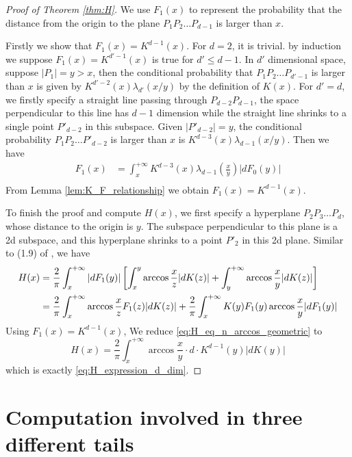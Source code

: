 \documentclass{aptpub}
\begin{document}
\begin{proof}[Proof of Theorem \ref{thm:H}]
     
We use $F_1(x)$ to represent the probability that
the distance from the origin to the plane $P_1P_2\dots P_{d-1}$
is larger than $x$.


Firstly we show that $F_1(x)=K^{d-1}(x)$.
For $d=2$, it is trivial.
by induction we suppose $F_1(x)=K^{d'-1}(x)$ is true for
$d'\leq d-1$. In $d'$ dimensional space, suppose $|P_1|=y>x$,
then the conditional probability that $P_1P_2\dots P_{d'-1}$ is larger than
$x$ is given by $K^{d'-2}(x)\lambda_{d'}(x/y)$ by the definition of $K(x)$.
For $d'=d$, 
we firstly specify a straight line passing through $P_{d-2}P_{d-1}$,
the space perpendicular 
to this line has $d-1$ dimension while the straight line shrinks to a single point $P'_{d-2}$
in this subspace. Given $|P'_{d-2}|=y$,
the conditional probability $P_1P_2\dots P'_{d-2}$ is larger than
$x$ is
$K^{d-3}(x)\lambda_{d-1}(x/y)$.
Then we have
\begin{align*}
    F_1(x) &= \int_x^{+\infty} K^{d-3}(x) \lambda_{d-1}(\frac{x}{y})|dF_0(y)| \\
\end{align*}
From Lemma \ref{lem:K_F_relationship} we obtain $F_1(x) = K^{d-1}(x)$.

To finish the proof and compute $H(x)$, we first specify a hyperplane $P_2P_3\dots P_{d}$,
whose distance to the origin is $y$. The subspace perpendicular to this plane is a 2d subspace,
and this hyperplane shrinks to a point $P'_2$ in this 2d plane.
Similar to (1.9) of \cite{carnal1970konvexe}, we have
\begin{align}\label{eq:H_eq_n_arccos_geometric}
     H(x) &= \frac{2}{\pi}\int_x^{+\infty}|dF_1(y)|
     \left[ \int_x^y \arccos\frac{x}{z}|dK(z)|
     +\int_y^{+\infty}\arccos\frac{x}{y} |dK(z)|\right]\\
     &=\frac{2}{\pi}\int_x^{+\infty} \arccos\frac{x}{z}
     F_1(z)|dK(z)|+\frac{2}{\pi}\int_{x}^{+\infty} K(y)F_1(y)\arccos\frac{x}{y}|dF_1(y)| \notag 
 \end{align}
Using $F_1(x)=K^{d-1}(x)$,
We reduce \eqref{eq:H_eq_n_arccos_geometric} to
 $$
 H(x) = \frac{2}{\pi}\int_x^{+\infty}  \arccos\frac{x}{y}\cdot
 d\cdot  K^{d-1}(y) |dK(y)|
 $$
 which is exactly \eqref{eq:H_expression_d_dim}.
 
\end{proof}
\section{Computation involved in three different tails}
\end{document}
